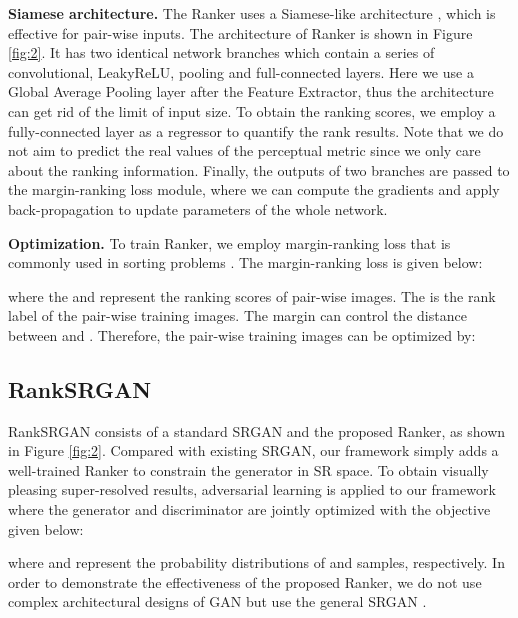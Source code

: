 \documentclass[10pt,twocolumn,letterpaper]{article}
\begin{document}
\textbf{Siamese architecture.} The Ranker uses a Siamese-like architecture \cite{bromley1994signature,chopra2005learning,zagoruyko2015learning}, which is effective for pair-wise inputs. The architecture of Ranker is shown in Figure \ref{fig:2}. It has two identical network branches which contain a series of convolutional, LeakyReLU, pooling and full-connected layers. Here we use a Global Average Pooling layer after the Feature Extractor, thus the architecture can get rid of the limit of input size. To obtain the ranking scores, we employ a fully-connected layer as a regressor to quantify the rank results. Note that we do not aim to predict the real values of the perceptual metric since we only care about the ranking information.  Finally, the outputs of two branches are passed to the margin-ranking loss module, where we can compute the gradients and apply back-propagation to update parameters of the whole network.

\textbf{Optimization.} To train Ranker, we employ margin-ranking loss that is commonly used in sorting problems \cite{yang2016deep,liu2017rankiqa}. The margin-ranking loss is given below:
\begin{small}

\end{small}where the  and  represent the ranking scores of pair-wise images. The  is the rank label of the pair-wise training images. The margin  can control the distance between  and . Therefore, the  pair-wise training images can be optimized by:

\begin{small}

\end{small}

\subsection{RankSRGAN}
\label{3.3}
RankSRGAN consists of a standard SRGAN and the proposed Ranker, as shown in Figure \ref{fig:2}. Compared with existing SRGAN, our framework simply adds a well-trained Ranker to constrain the generator in SR space. To obtain visually pleasing super-resolved results, adversarial learning \cite{ledig2017photo,sajjadi2017enhancenet} is applied to our framework where the generator and discriminator are jointly optimized with the objective given below:
\begin{small}

\end{small}where  and  represent the probability distributions of  and  samples, respectively. In order to demonstrate the effectiveness of the proposed Ranker, we do not use complex architectural designs of GAN \cite{Wang_2018_ECCV_Workshops} but use the general SRGAN \cite{ledig2017photo}.
\end{document}
